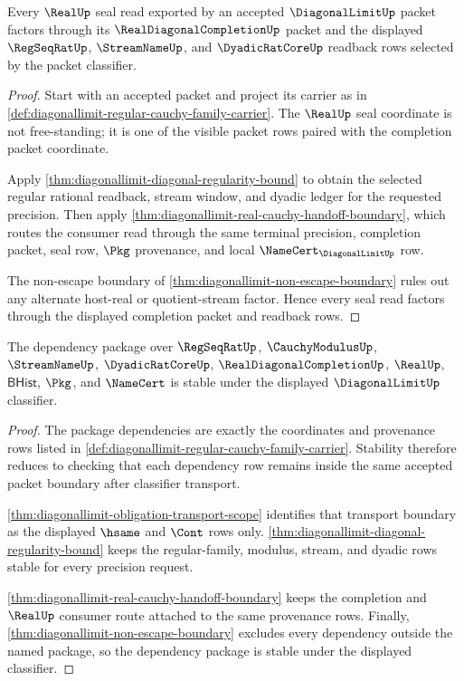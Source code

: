 \begin{theorem}
\label{thm:diagonallimit-completion-seal-factorization}
Every $\RealUp$ seal read exported by an accepted $\DiagonalLimitUp$ packet factors through its $\RealDiagonalCompletionUp$ packet and the displayed $\RegSeqRatUp$, $\StreamNameUp$, and $\DyadicRatCoreUp$ readback rows selected by the packet classifier.
\end{theorem}
\begin{proof}
Start with an accepted packet and project its carrier as in \autoref{def:diagonallimit-regular-cauchy-family-carrier}. The $\RealUp$ seal coordinate is not free-standing; it is one of the visible packet rows paired with the completion packet coordinate.

Apply \autoref{thm:diagonallimit-diagonal-regularity-bound} to obtain the selected regular rational readback, stream window, and dyadic ledger for the requested precision. Then apply \autoref{thm:diagonallimit-real-cauchy-handoff-boundary}, which routes the consumer read through the same terminal precision, completion packet, seal row, $\Pkg$ provenance, and local $\NameCert_{\DiagonalLimitUp}$ row.

The non-escape boundary of \autoref{thm:diagonallimit-non-escape-boundary} rules out any alternate host-real or quotient-stream factor. Hence every seal read factors through the displayed completion packet and readback rows.
\end{proof}

\begin{theorem}
\label{thm:diagonallimit-dependency-stability-package}
The dependency package over $\RegSeqRatUp$, $\CauchyModulusUp$, $\StreamNameUp$, $\DyadicRatCoreUp$, $\RealDiagonalCompletionUp$, $\RealUp$, $\mathsf{BHist}$, $\Pkg$, and $\NameCert$ is stable under the displayed $\DiagonalLimitUp$ classifier.
\end{theorem}
\begin{proof}
The package dependencies are exactly the coordinates and provenance rows listed in \autoref{def:diagonallimit-regular-cauchy-family-carrier}. Stability therefore reduces to checking that each dependency row remains inside the same accepted packet boundary after classifier transport.

\autoref{thm:diagonallimit-obligation-transport-scope} identifies that transport boundary as the displayed $\hsame$ and $\Cont$ rows only. \autoref{thm:diagonallimit-diagonal-regularity-bound} keeps the regular-family, modulus, stream, and dyadic rows stable for every precision request.

\autoref{thm:diagonallimit-real-cauchy-handoff-boundary} keeps the completion and $\RealUp$ consumer route attached to the same provenance rows. Finally, \autoref{thm:diagonallimit-non-escape-boundary} excludes every dependency outside the named package, so the dependency package is stable under the displayed classifier.
\end{proof}

